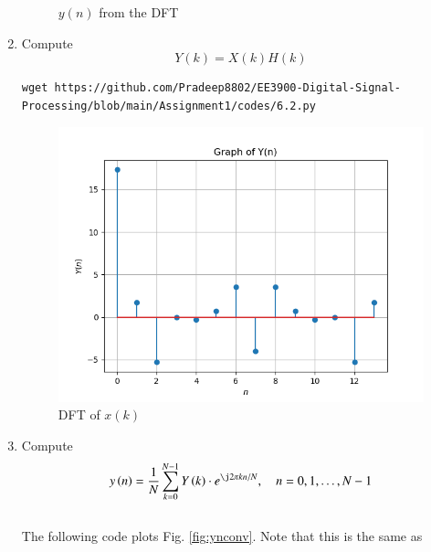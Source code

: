 \documentclass[journal,12pt,twocolumn]{IEEEtran}
\renewcommand\thesection{\arabic{section}}
\begin{document}
\begin{enumerate}[label=\thesection.\arabic*]
\begin{figure}[!ht]
	\caption{$y(n)$ from the DFT}
	\label{fig:6.1_2}
\end{figure}
\item Compute 
\begin{equation}
Y(k) = X(k)H(k)
\end{equation}
\solution \begin{lstlisting}
wget https://github.com/Pradeep8802/EE3900-Digital-Signal-Processing/blob/main/Assignment1/codes/6.2.py
\end{lstlisting}
\begin{figure}[!ht]
	\centering
	\includegraphics[width=\columnwidth]{./figs/6.2.png}
	\caption{DFT of $x(k)$}
	\label{fig:6.2}
\end{figure}

\item Compute
\begin{equation}
y\brak{n}={\frac {1}{N}}\sum _{k=0}^{N-1}Y\brak{k}\cdot e^{\j 2\pi kn/N},\quad n = 0,1,\dots, N-1
\end{equation}
\\
\solution The following code plots Fig. \ref{fig:ynconv}. Note that this is the same as 


\end{enumerate}
\end{document}

